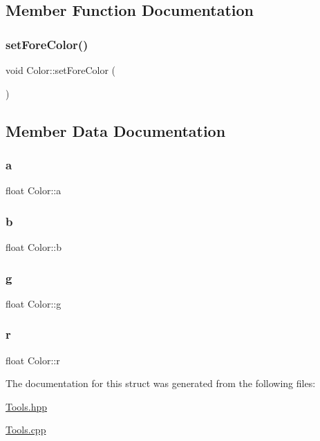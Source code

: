 \subsection{Member Function Documentation}
\hypertarget{struct_color_ab277df545876e66a8094fd5d3dbbcaf2}{}\label{struct_color_ab277df545876e66a8094fd5d3dbbcaf2} 
\subsubsection{\texorpdfstring{set\+Fore\+Color()}{setForeColor()}}
{\footnotesize\ttfamily void Color\+::set\+Fore\+Color (\begin{DoxyParamCaption}{ }\end{DoxyParamCaption})}



\subsection{Member Data Documentation}
\hypertarget{struct_color_a98047aee65fc3d825f88a76da728fd27}{}\label{struct_color_a98047aee65fc3d825f88a76da728fd27} 
\subsubsection{\texorpdfstring{a}{a}}
{\footnotesize\ttfamily float Color\+::a}

\hypertarget{struct_color_a33e482be18d6ea31d2b403bee13683b7}{}\label{struct_color_a33e482be18d6ea31d2b403bee13683b7} 
\subsubsection{\texorpdfstring{b}{b}}
{\footnotesize\ttfamily float Color\+::b}

\hypertarget{struct_color_a5defbb21620e480e556181772d665f34}{}\label{struct_color_a5defbb21620e480e556181772d665f34} 
\subsubsection{\texorpdfstring{g}{g}}
{\footnotesize\ttfamily float Color\+::g}

\hypertarget{struct_color_a3958a556b47d2de3dd45c75aac833c20}{}\label{struct_color_a3958a556b47d2de3dd45c75aac833c20} 
\subsubsection{\texorpdfstring{r}{r}}
{\footnotesize\ttfamily float Color\+::r}



The documentation for this struct was generated from the following files\+:\begin{DoxyCompactItemize}
\item 
\hyperlink{_tools_8hpp}{Tools.\+hpp}\item 
\hyperlink{_tools_8cpp}{Tools.\+cpp}\end{DoxyCompactItemize}

